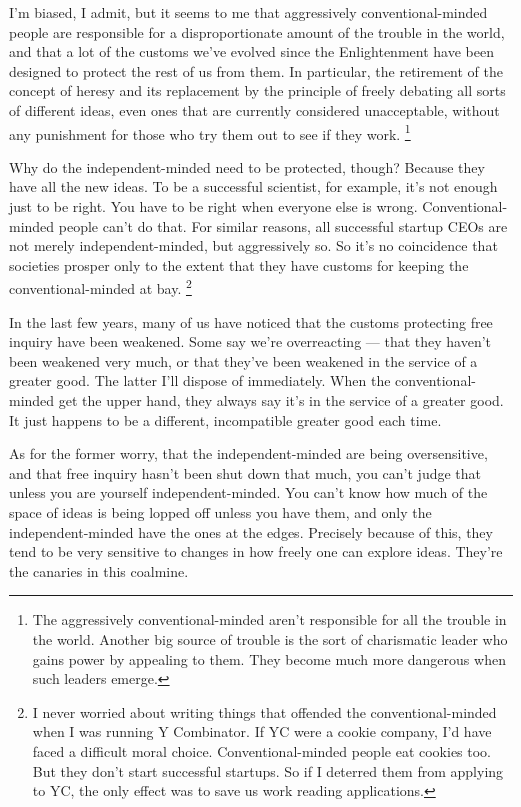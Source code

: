 \documentclass[12pt]{book}
\begin{document}
I'm biased, I admit, but it seems to me that aggressively
conventional-minded people are responsible for a disproportionate amount
of the trouble in the world, and that a lot of the customs we've evolved
since the Enlightenment have been designed to protect the rest of us
from them. In particular, the retirement of the concept of heresy and
its replacement by the principle of freely debating all sorts of
different ideas, even ones that are currently considered unacceptable,
without any punishment for those who try them out to see if they work.
\footnote{The aggressively conventional-minded aren't responsible for all
the trouble in the world. Another big source of trouble is the sort of
charismatic leader who gains power by appealing to them. They become
much more dangerous when such leaders emerge.}

Why do the independent-minded need to be protected, though? Because they
have all the new ideas. To be a successful scientist, for example, it's
not enough just to be right. You have to be right when everyone else is
wrong. Conventional-minded people can't do that. For similar reasons,
all successful startup CEOs are not merely independent-minded, but
aggressively so. So it's no coincidence that societies prosper only to
the extent that they have customs for keeping the conventional-minded at
bay. \footnote{I never worried about writing things that offended the
conventional-minded when I was running Y Combinator. If YC were a cookie
company, I'd have faced a difficult moral choice. Conventional-minded
people eat cookies too. But they don't start successful startups. So if
I deterred them from applying to YC, the only effect was to save us work
reading applications.}

In the last few years, many of us have noticed that the customs
protecting free inquiry have been weakened. Some say we're overreacting
--- that they haven't been weakened very much, or that they've been
weakened in the service of a greater good. The latter I'll dispose of
immediately. When the conventional-minded get the upper hand, they
always say it's in the service of a greater good. It just happens to be
a different, incompatible greater good each time.

As for the former worry, that the independent-minded are being
oversensitive, and that free inquiry hasn't been shut down that much,
you can't judge that unless you are yourself independent-minded. You
can't know how much of the space of ideas is being lopped off unless you
have them, and only the independent-minded have the ones at the edges.
Precisely because of this, they tend to be very sensitive to changes in
how freely one can explore ideas. They're the canaries in this coalmine.
\end{document}

